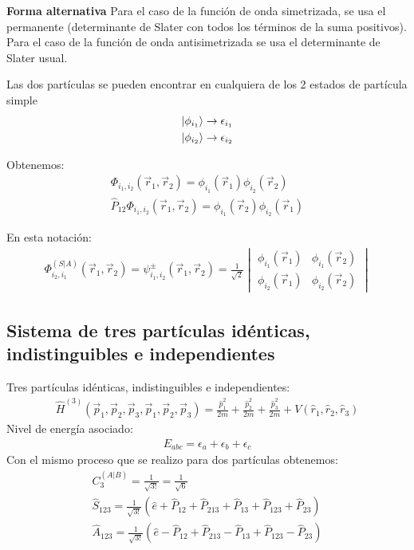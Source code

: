 \documentclass{article}
\begin{document}
\hfill 

\hfill 

\textbf{Forma alternativa } Para el caso de la función de onda simetrizada, se usa el permanente (determinante de Slater con todos los términos de la suma positivos). Para el caso de la función de onda antisimetrizada se usa el determinante de Slater usual.

Las dos partículas se pueden encontrar en cualquiera de los 2 estados de partícula simple 
\begin{gather*}
  \ket{\phi _{i_1 } } \rightarrow \epsilon _{i_1 } \\
  \ket{\phi _{i_2 } } \rightarrow \epsilon _{i_2 }  \\
\end{gather*}

Obtenemos: 
\begin{gather*}
  \Phi _{i_1, i_2 } (\vec r_1, \vec r_2 ) = \phi _{i_1 } (\vec r_1 )\phi _{i_2 } (\vec r_2 ) \\
  \hat P _{12 } \Phi _{i_1, i_2 } (\vec r_1, \vec r_2 ) = \phi _{i_1 } (\vec r_2 )\phi _{i_2 } (\vec r_1 ) 
\end{gather*}

En esta notación: 
\begin{gather*}
  \Phi ^ {(S|A ) } _{i_2 , i _1 } (\vec r _ 1, \vec r_2 ) = \psi ^ {\pm } _{i_1,i_2 } (\vec r_1, \vec r_2 ) = \frac{1}{\sqrt{2 } } 
  \begin{vmatrix}
      \phi _{i_1 } (\vec r_1 ) & \phi _{i_1 } (\vec r_2 ) \\
      \phi _{i_2 } (\vec r_1 ) & \phi _{i_2 } (\vec r_2 )
  \end{vmatrix}  
\end{gather*}

\subsection{Sistema de tres partículas idénticas, indistinguibles e independientes } 
Tres partículas idénticas, indistinguibles e independientes: 
\begin{gather*}
  \hat H ^ {(3)} (\vec p_1, \vec p_2,\vec p_3,\vec p_1,\vec p_2,\vec p_3) = \frac{\hat p_1^2 }{2m } + \frac{\hat p_2^2 }{2m } + \frac{\hat p_3^2 }{2m } + V(\hat r_1, \hat r_2 , \hat r_3 )
\end{gather*}
Nivel de energía asociado: 
\begin{gather*}
  E _{abc } = \epsilon_a + \epsilon_b + \epsilon_c  
\end{gather*}
Con el mismo proceso que se realizo para dos partículas obtenemos: 
\begin{gather*}
  C_3 ^ {(A|B )} = \frac{1}{\sqrt{3! } } = \frac{1}{\sqrt{6 } } \\
  \hat S _{123 } = \frac{1}{\sqrt{3! } } (\hat e + \hat P _{12 }  + \hat P _{213 } + \hat P _{13 } + \hat P _{123 } + \hat P _{23 }) \\
  \hat A _{123 } = \frac{1}{\sqrt{3! } } (\hat e - \hat P _{12 }  + \hat P _{213 } - \hat P _{13 } + \hat P _{123 } - \hat P _{23 }) 
\end{gather*}
\end{document}

